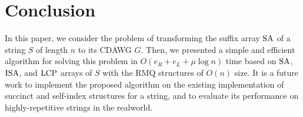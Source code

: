 \section{Conclusion}
\label{sec:concl}
In this paper, we consider the problem of transforming the suffix array $\mathrm{SA}$ of a string $S$ of length $n$ to its CDAWG $G$. Then, we  presented a simple and efficient algorithm for solving this problem in $O(e_R + e_L + \mu\log n)$ time  based on $\mathrm{SA}$, $\mathrm{ISA}$, and $\mathrm{LCP}$ arrays of $S$ with the RMQ structures of $O(n)$ size.
It is a future work to implement the proposed algorithm on the existing implementation of succinct and self-index structures for a string, and to evaluate its performance on highly-repetitive strings in the realworld. 


